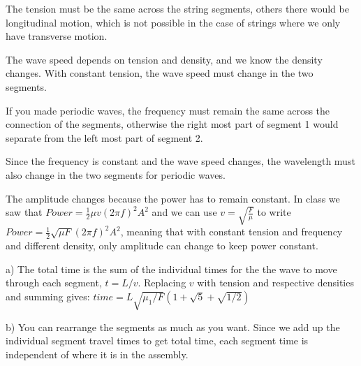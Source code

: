 \documentclass[10pt]{article}
\newenvironment{problem}[2][Problem]{\begin{trivlist}
\item[\hskip \labelsep {\bfseries #1}\hskip \labelsep {\bfseries #2.}]}{\end{trivlist}}
\begin{document}
\begin{problem}{3}
\item
The tension must be the same across the string segments, others there would be longitudinal motion, which is not possible in the case of strings where we only have transverse motion.
\item
The wave speed depends on tension and density, and we know the density changes. With constant tension, the wave speed must change in the two segments.
\item
If you made periodic waves, the frequency must remain the same across the connection of the segments, otherwise the right most part of segment 1 would separate from the left most part of segment 2.
\item
Since the frequency is constant and the wave speed changes, the wavelength must also change in the two segments for periodic waves.
\item
The amplitude changes because the power has to remain constant. In class we saw that $Power =  \frac{1}{2}\mu v (2\pi f)^2 A^2$ and we can use $v = \sqrt{\frac{F}{\mu}}$ to write $Power = \frac{1}{2} \sqrt{\mu F} (2\pi f)^2 A^2$, meaning that with constant tension and frequency and different density, only amplitude can change to keep power constant.
\end{problem}

\begin{problem}{4}
\item a) The total time is the sum of the individual times for the the wave to move through each segment, $t = L/v$. Replacing $v$ with tension and respective densities and summing gives:
$time = L \sqrt{\mu_1/ F}\left(1 + \sqrt{5} + \sqrt{1/2}\right)$
\item b) You can rearrange the segments as much as you want. Since we add up the individual segment travel times to get total time, each segment time is independent of where it is in the assembly.

\end{problem}
\end{document}
